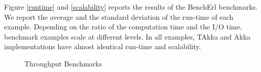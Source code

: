 Figure \ref{runtime} and \ref{scalability} reports the results of the BenchErl 
benchmarks.   We report the average and the standard deviation 
of the run-time of each example.  Depending on the ratio of the computation 
time and the I/O time, benchmark examples scale at different levels.  In 
all examples, TAkka and Akka implementations have almost identical 
run-time and scalability.


\begin{figure}[h]
     \begin{center}
    \end{center}
     \caption{Throughput Benchmarks}
   \label{throughput}
\end{figure}


